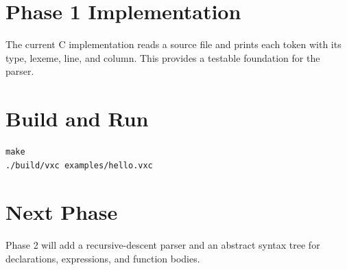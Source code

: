 \documentclass[11pt,a4paper]{article}
\begin{document}
\section{Phase 1 Implementation}
The current C implementation reads a source file and prints each token with its type, lexeme, line, and column. This provides a testable foundation for the parser.
\section{Build and Run}
\begin{lstlisting}
make
./build/vxc examples/hello.vxc
\end{lstlisting}
\section{Next Phase}
Phase 2 will add a recursive-descent parser and an abstract syntax tree for declarations, expressions, and function bodies.
\end{document}
